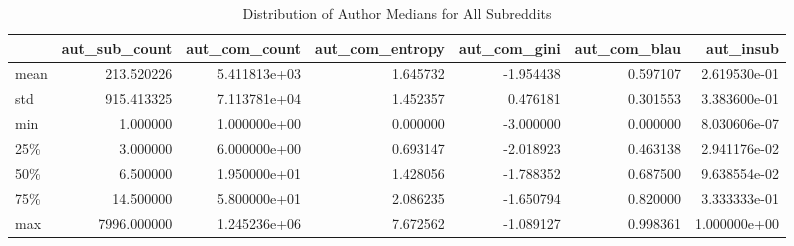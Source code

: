 \begin{table}
\centering
\begin{tabular}{lrrrrrr}
\toprule
{} &  aut\_sub\_count &  aut\_com\_count &  aut\_com\_entropy &  aut\_com\_gini &  aut\_com\_blau &     aut\_insub \\
\midrule
mean &     213.520226 &   5.411813e+03 &         1.645732 &     -1.954438 &      0.597107 &  2.619530e-01 \\
std  &     915.413325 &   7.113781e+04 &         1.452357 &      0.476181 &      0.301553 &  3.383600e-01 \\
min  &       1.000000 &   1.000000e+00 &         0.000000 &     -3.000000 &      0.000000 &  8.030606e-07 \\
25\%  &       3.000000 &   6.000000e+00 &         0.693147 &     -2.018923 &      0.463138 &  2.941176e-02 \\
50\%  &       6.500000 &   1.950000e+01 &         1.428056 &     -1.788352 &      0.687500 &  9.638554e-02 \\
75\%  &      14.500000 &   5.800000e+01 &         2.086235 &     -1.650794 &      0.820000 &  3.333333e-01 \\
max  &    7996.000000 &   1.245236e+06 &         7.672562 &     -1.089127 &      0.998361 &  1.000000e+00 \\
\bottomrule
\end{tabular}
\caption{Distribution of Author Medians for All Subreddits}
\label{table/author-medians:all}
\end{table}